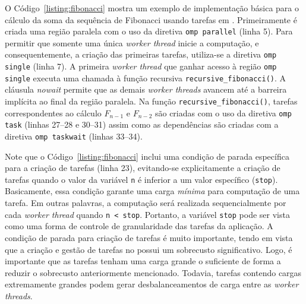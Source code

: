 \documentclass{SBCbookchapter}
\begin{document}
	O Código~\ref{listing:fibonacci} mostra um exemplo de implementação básica para o cálculo da soma da sequência
	de Fibonacci usando tarefas em \openmp. Primeiramente é criada uma região paralela com o uso da diretiva
	\texttt{omp parallel} (linha 5). Para permitir que somente uma única \textit{worker thread} inicie a computação, e
	consequentemente, a criação das primeiras tarefas, utiliza-se a diretiva \texttt{omp single} (linha 7). A primeira
	\textit{worker thread} que ganhar acesso à região \texttt{omp single} executa uma chamada à função recursiva 
	\texttt{recursive\_fibonacci()}. A cláusula \textit{nowait} permite que as demais \textit{worker threads} avancem até
	a barreira implícita ao final da região paralela. Na função \texttt{recursive\_fibonacci()}, tarefas correspondentes ao
	cálculo $F_{n-1}$ e $F_{n-2}$ são criadas com o uso da diretiva \texttt{omp task} (linhas 27--28 e 30--31) assim
	como as dependências são criadas com a diretiva \texttt{omp taskwait} (linhas 33--34).
	
	Note que o Código~\ref{listing:fibonacci} inclui uma condição de parada específica para a criação de tarefas (linha 23),
	evitando-se explicitamente a criação de tarefas quando o valor da variável \texttt{n} é inferior a um valor específico (\texttt{stop}). 
	Basicamente, essa condição garante uma carga \textit{mínima} para computação de uma tarefa. Em outras palavras, a
	computação será realizada sequencialmente por cada \textit{worker thread} quando \texttt{n < stop}. Portanto,
	a variável \texttt{stop} pode ser vista como uma forma de controle de granularidade das tarefas da aplicação.
	A condição de parada para criação de tarefas é muito importante, tendo em vista que a criação e gestão de tarefas no
	\openmp possui um sobrecusto significativo. Logo, é importante que as tarefas tenham uma carga grande o suficiente de forma
	a reduzir o sobrecusto anteriormente mencionado. Todavia, tarefas contendo cargas extremamente grandes podem gerar
	desbalanceamentos de carga entre as \textit{worker threads}.
\end{document}
